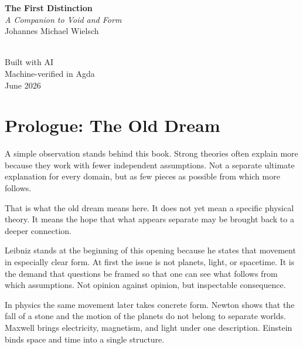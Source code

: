 \documentclass[11pt,a4paper]{book}
\begin{document}
\raggedbottom

\begin{titlepage}
\centering
\vspace*{3cm}
{\Huge\bfseries The First Distinction}\\[0.5cm]
{\Large\itshape A Companion to Void and Form}\\[2cm]
{\large Johannes Michael Wielsch}\\[4cm]
\\[4cm]
{\small Built with AI}\\
{\small Machine-verified in Agda}\\
\vfill
{\small June 2026}\\[0.5cm]
\end{titlepage}
\clearpage

\frontmatter

\chapter*{Prologue: The Old Dream}

A simple observation stands behind this book. Strong theories often explain
more because they work with fewer independent assumptions. Not a separate
ultimate explanation for every domain, but as few pieces as possible from
which more follows.

That is what the old dream means here. It does not yet mean a specific
physical theory. It means the hope that what appears separate may be brought
back to a deeper connection.

Leibniz stands at the beginning of this opening because he states that
movement in especially clear form. At first the issue is not planets, light,
or spacetime. It is the demand that questions be framed so that one can see
what follows from which assumptions. Not opinion against opinion, but
inspectable consequence.

In physics the same movement later takes concrete form. Newton shows that
the fall of a stone and the motion of the planets do not belong to separate
worlds. Maxwell brings electricity, magnetism, and light under one
description. Einstein binds space and time into a single structure.
\end{document}
